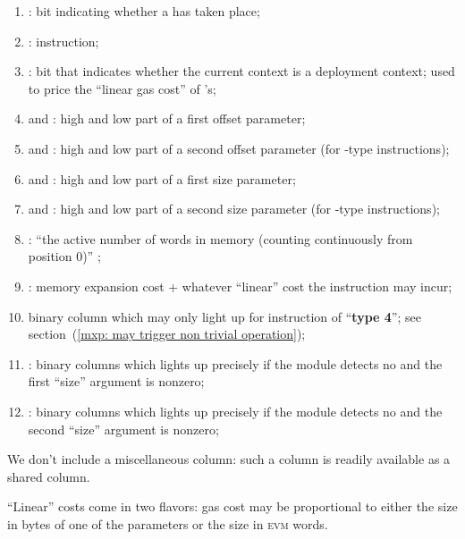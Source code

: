 \begin{enumerate}[resume]
	\item \miscMxpMxpx{}:
		bit indicating whether a \mxpxSH{} has taken place;
	\item \miscMxpInst{}:
		\mxpMod{} instruction; 
	\item \miscMxpCodeDeployment{}:
		bit that indicates whether the current context is a deployment context; used to price the ``linear gas cost'' of 's;
	\item \miscMxpOffsetOneHi{} and \miscMxpOffsetOneLo{}:
		high and low part of a first offset parameter;
	\item \miscMxpOffsetTwoHi{} and \miscMxpOffsetTwoLo{}:
		high and low part of a second offset parameter (for -type instructions);
	\item \miscMxpSizeOneHi{} and \miscMxpSizeOneLo{}:
		high and low part of a first size parameter;
	\item \miscMxpSizeTwoHi{} and \miscMxpSizeTwoLo{}:
		high and low part of a second size parameter (for -type instructions);
	\item \miscMxpWords{}:
		``the active number of words in memory (counting continuously from position $0$)'' ;
	\item \miscMxpGasMxp{}:
		memory expansion cost + whatever ``linear'' cost the instruction may incur;
	\item \miscMxpTypeFourInstMayTriggerMmu{}
		binary column which may only light up for \mxpMod{} instruction of ``\textbf{type 4}'';
		see section~(\ref{mxp: may trigger non trivial operation});
	\item \miscMxpSizeOneNonzeroNoMxpx{}:
		binary columns which lights up precisely if the \mxpMod{} module detects no \mxpxSH{} and the first ``size'' argument is nonzero;
	\item \miscMxpSizeTwoNonzeroNoMxpx{}:
		binary columns which lights up precisely if the \mxpMod{} module detects no \mxpxSH{} and the second ``size'' argument is nonzero;
\end{enumerate}
\saNote{} We don't include a miscellaneous \mxpStamp{} column: such a column is readily available as a shared column.

\saNote{} ``Linear'' costs come in two flavors: gas cost may be proportional to either the size in bytes of one of the parameters or the size in \textsc{evm} words.
